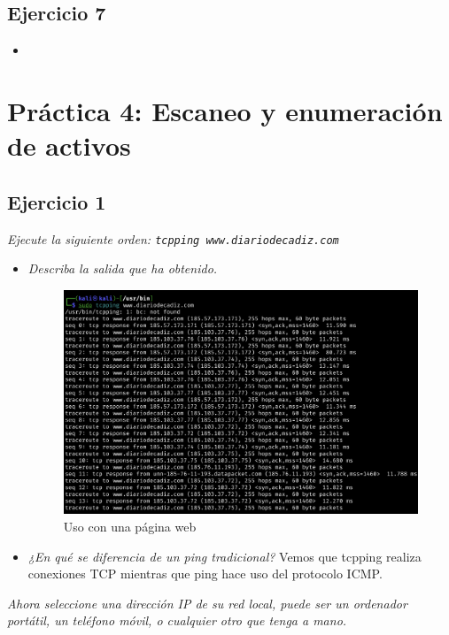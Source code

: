 \documentclass[12pt]{book}
\begin{document}
\section{Ejercicio 7}
\textit{}
\begin{itemize}
    \item 
\end{itemize}

\chapter{Práctica 4: Escaneo y enumeración de activos}

\section{Ejercicio 1}
\textit{Ejecute la siguiente orden: \texttt{tcpping www.diariodecadiz.com}}
\begin{itemize}
    \item \textit{Describa la salida que ha obtenido.}
    \begin{figure}[h]
        \centering
        \includegraphics[width=.7\linewidth]{Practica 3y4/images/Screenshot 2024-11-07 at 20.09.25.png}
        \caption{Uso con una página web}
        \label{fig:enter-label}
    \end{figure}
    \item \textit{¿En qué se diferencia de un ping tradicional?}
    \newline
    \newline
    Vemos que tcpping realiza conexiones TCP mientras que ping hace uso del protocolo ICMP.
\end{itemize}
\textit{Ahora seleccione una dirección IP de su red local, puede ser un ordenador portátil,
un teléfono móvil, o cualquier otro que tenga a mano.}
\end{document}
